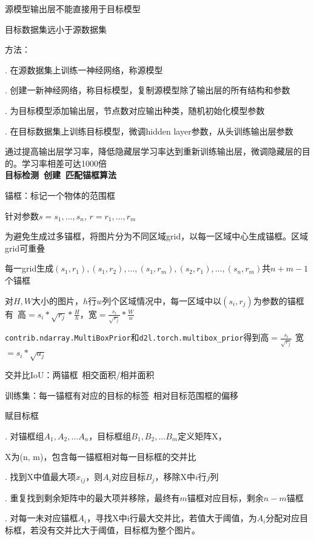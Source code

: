 \documentclass[UTF8]{ctexart}
\begin{document}
  \quad 源模型输出层不能直接用于目标模型

  \quad 目标数据集远小于源数据集

  方法：
 
  . 在源数据集上训练一神经网络，称源模型

  . 创建一新神经网络，称目标模型，复制源模型除了输出层的所有结构和参数

  . 为目标模型添加输出层，节点数对应输出种类，随机初始化模型参数

  . 在目标数据集上训练目标模型，微调hidden layer参数，从头训练输出层参数

  \quad \quad 通过提高输出层学习率，降低隐藏层学习率达到重新训练输出层，微调隐藏层的目的。学习率相差可达1000倍\\
\textbf{目标检测\ 创建\ 匹配锚框算法}

  锚框：标记一个物体的范围框

  \quad 针对参数$s = {s_1, ..., s_n}$, $r = {r_1, ..., r_m}$

  \quad 为避免生成过多锚框，将图片分为不同区域grid，以每一区域中心生成锚框。区域grid可重叠

  \quad 每一grid生成$(s_1, r_1), (s_1, r_2), ..., (s_1, r_m), (s_2, r_1), ..., (s_n, r_m)$共$n+m-1$个锚框

  \quad 对$H, W$大小的图片，$h$行$w$列个区域情况中，每一区域中以$(s_i, r_j)$为参数的锚框有\ 高$ = s_i*\sqrt{r_j} * \frac{H}{h}$，宽$ = \frac{s_i}{\sqrt{r_j}} * \frac{W}{w}$

  \quad \quad \texttt{contrib.ndarray.MultiBoxPrior}和\texttt{d2l.torch.multibox\_prior}得到高$=\frac{s_i}{\sqrt{r_j}}$ 宽$ = s_i*\sqrt{a_j}$

  交并比IoU：两锚框\ 相交面积/相并面积

  训练集：每一锚框有对应的目标的标签\ 相对目标范围框的偏移

  \quad 赋目标框

  \quad {}. 对锚框组$A_1, A_2, ...A_n$，目标框组$B_1, B_2, ...B_m$定义矩阵X，

  \quad \quad \quad X为(n, m)，包含每一锚框相对每一目标框的交并比

  \quad {}. 找到X中值最大项$x_{ij}$，则$A_i$对应目标$B_j$，移除X中$i$行$j$列

  \quad {}. 重复找到剩余矩阵中的最大项并移除，最终有$m$锚框对应目标，剩余$n-m$锚框

  \quad {}. 对每一未对应锚框$A_i$，寻找X中i行最大交并比，若值大于阈值，为$A_i$分配对应目标框，若没有交并比大于阈值，目标框为整个图片。
\end{document}
